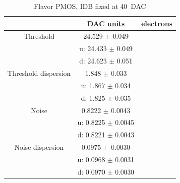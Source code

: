         \begin{table}
                \begin{center}
                \begin{tabular}{| c | c | c |}
                \hline
                 & DAC units & electrons \\
                \hline
                \hline
                Threshold        & 24.529 $\pm$ 0.049 & \\
                                 &u: 24.433 $\pm$ 0.049 & \\ 
                                 &d: 24.623 $\pm$ 0.051 &    \\      
                Threshold dispersion & 1.848 $\pm$ 0.033 &\\
                                 &u: 1.867 $\pm$ 0.034 & \\ 
                                 &d: 1.825 $\pm$ 0.035 &    \\ 
                Noise            & 0.8222 $\pm$ 0.0043 & \\
                                 &u: 0.8225 $\pm$ 0.0045 & \\ 
                                 &d: 0.8221 $\pm$ 0.0043 &    \\      
                Noise dispersion & 0.0975 $\pm$ 0.0030 &\\
                                 &u: 0.0968 $\pm$ 0.0031 & \\ 
                                 &d: 0.0970 $\pm$ 0.0030 &    \\ 
                \hline
                \end{tabular}
                \caption{Flavor PMOS, IDB fixed at \SI{40}{DAC}}
                \label{tab:}
                \end{center}
        \end{table}        
    
